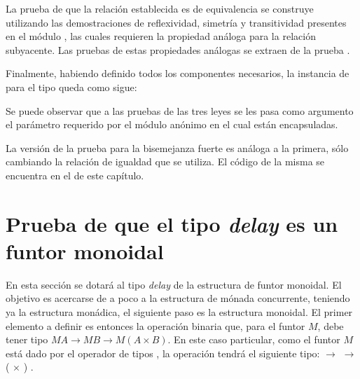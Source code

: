 \begin{AgdaAlign}

La prueba de que la relación establecida es de equivalencia se construye utilizando las demostraciones de reflexividad, simetría y transitividad presentes en el módulo , las cuales requieren la propiedad análoga para la relación subyacente. Las pruebas de estas propiedades análogas se extraen de la prueba . 


Finalmente, habiendo definido todos los componentes necesarios, la instancia de  para el tipo \AgdaDatatype{$\_\bot$} queda como sigue:

\end{AgdaAlign}

Se puede observar que a las pruebas de las tres leyes se les pasa como argumento el parámetro requerido por el módulo anónimo en el cual están encapsuladas. 

La versión de la prueba para la bisemejanza fuerte es análoga a la primera, sólo cambiando la relación de igualdad que se utiliza. El código de la misma se encuentra en el  de este capítulo.


\section{Prueba de que el tipo \textit{delay} es un funtor monoidal}\label{casodelay:monoidal}

En esta sección se dotará al tipo \textit{delay} de la estructura de funtor monoidal. El objetivo es acercarse de a poco a la estructura de mónada concurrente, teniendo ya la estructura monádica, el siguiente paso es la estructura monoidal. El primer elemento a definir es entonces la operación binaria que, para el funtor $\mathit{M}$, debe tener tipo $\mathit{M} A \rightarrow \mathit{M} B \rightarrow \mathit{M} (A \times B)$.  En este caso particular, como el funtor $\mathit{M}$ está dado por el operador de tipos \AgdaDatatype{$\_\bot$}, la operación  tendrá el siguiente tipo:  \AgdaDatatype{$\bot$} $\rightarrow$  \AgdaDatatype{$\bot$} $\rightarrow$ ( $\times$ ) \AgdaDatatype{$\bot$}.


